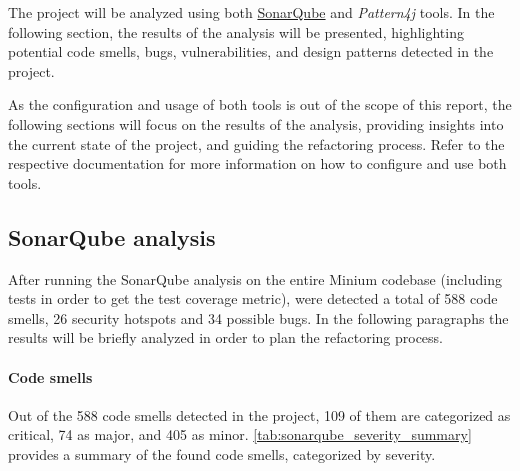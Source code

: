 The project will be analyzed using both \href{https://www.sonarsource.com/}{SonarQube} and \textit{Pattern4j} tools. In the following section, the results of the analysis will be presented, highlighting potential code smells, bugs, vulnerabilities, and design patterns detected in the project.

As the configuration and usage of both tools is out of the scope of this report, the following sections will focus on the results of the analysis, providing insights into the current state of the project, and guiding the refactoring process. Refer to the respective documentation for more information on how to configure and use both tools.

\subsection{SonarQube analysis}

After running the SonarQube analysis on the entire Minium codebase (including tests in order to get the test coverage metric), were detected a total of 588 code smells, 26 security hotspots and 34 possible bugs. In the following paragraphs the results will be briefly analyzed in order to plan the refactoring process.

\paragraph*{Code smells} Out of the 588 code smells detected in the project, 109 of them are categorized as critical, 74 as major, and 405 as minor. \autoref{tab:sonarqube_severity_summary} provides a summary of the found code smells, categorized by severity.

